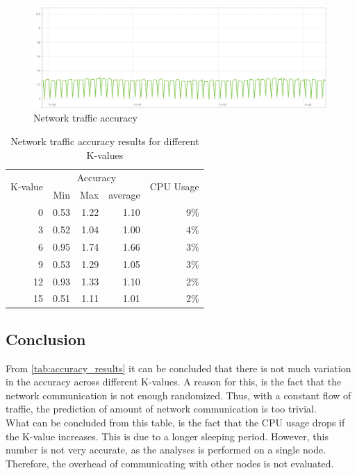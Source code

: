 \begin{figure}
    \centering
    \includegraphics[width=\textwidth]{gfx/traffic_network_accuracy}
    \caption{Network traffic accuracy}
    \label{fig:network_traffic_accuracy}
\end{figure}

\begin{table}[ht]
    \centering
    \begin{tabular}{r|rrr|r}
        \multirow{2}{*}{K-value} & \multicolumn{3}{|c|}{Accuracy} & \multirow{2}{*}{CPU Usage} \\
        & Min & Max & average & \\ \hline        
        0 & 0.53& 1.22& 1.10& 9\% \\
        3 & 0.52& 1.04& 1.00& 4\% \\
        6 & 0.95& 1.74& 1.66& 3\% \\
        9 & 0.53& 1.29& 1.05& 3\% \\
        12& 0.93& 1.33& 1.10& 2\% \\
        15& 0.51& 1.11& 1.01& 2\% \\        
    \end{tabular}
    \caption{Network traffic accuracy results for different K-values}
    \label{tab:accuracy_results}
\end{table}

\subsection{Conclusion}
From \autoref{tab:accuracy_results} it can be concluded that there is not much variation in the accuracy across different K-values. A reason for this, is the fact that the network communication is not enough randomized. Thus, with a constant flow of traffic, the prediction of amount of network communication is too trivial.\\

\noindent
What can be concluded from this table, is the fact that the CPU usage drops if the K-value increases. This is due to a longer sleeping period. However, this number is not very accurate, as the analyses is performed on a single node. Therefore, the overhead of communicating with other nodes is not evaluated.